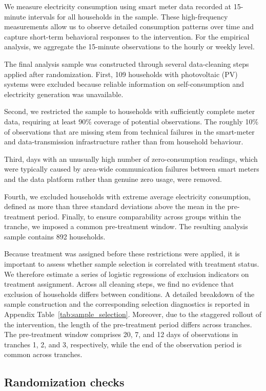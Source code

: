 We measure electricity consumption using smart meter data recorded at 15-minute intervals for all households in the sample. These high-frequency measurements allow us to observe detailed consumption patterns over time and capture short-term behavioral responses to the intervention. For the empirical analysis, we aggregate the 15-minute observations to the hourly or weekly level.

The final analysis sample was constructed through several data-cleaning steps applied after randomization. First, 109 households with photovoltaic (PV) systems were excluded because reliable information on self-consumption and electricity generation was unavailable. 

Second, we restricted the sample to households with sufficiently complete meter data, requiring at least 90\% coverage of potential observations. The roughly 10\% of observations that are missing stem from technical failures in the smart-meter and data-transmission infrastructure rather than from household behaviour.

Third, days with an unusually high number of zero-consumption readings, which were typically caused by area-wide communication failures between smart meters and the data platform rather than genuine zero usage, were removed.

Fourth, we excluded households with extreme average electricity consumption, defined as more than three standard deviations above the mean in the pre-treatment period. Finally, to ensure comparability across groups within the tranche, we imposed a common pre-treatment window. The resulting analysis sample contains 892 households.

Because treatment was assigned before these restrictions were applied, it is important to assess whether sample selection is correlated with treatment status. We therefore estimate a series of logistic regressions of exclusion indicators on treatment assignment. Across all cleaning steps, we find no evidence that exclusion of households differs between conditions. A detailed breakdown of the sample construction and the corresponding selection diagnostics is reported in Appendix Table~\ref{tab:sample_selection}. Moreover, due to the staggered rollout of the intervention, the length of the pre-treatment period differs across tranches. The pre-treatment window comprises 20, 7, and 12 days of observations in tranches 1, 2, and 3, respectively, while the end of the observation period is common across tranches.

\subsection{Randomization checks}


